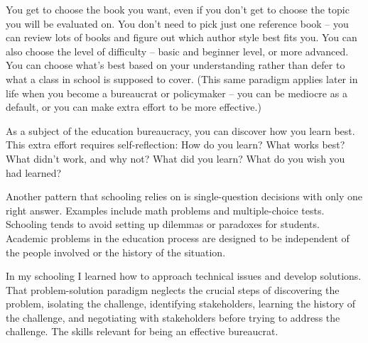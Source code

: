You get to choose the book you want, even if you don't get to choose the topic you will be evaluated on. You don't  need to pick just one reference book -- you can review lots of books and figure out which author style best fits you. You can also choose the level of difficulty -- basic and beginner level, or more advanced. You can choose what's best based on your understanding rather than defer to what a class in school is supposed to cover. (This same paradigm applies later in life when you become a bureaucrat or policymaker -- you can be mediocre as a default, or you can make extra effort to be more effective.)

As a subject of the education bureaucracy, you can discover how you learn best. This extra effort requires self-reflection: How do you learn? What works best? What didn't work, and why not? What did you learn? What do you wish you had learned?

Another pattern that schooling relies on is single-question decisions with only one right answer. Examples include math problems and multiple-choice tests. Schooling tends to avoid setting up dilemmas or paradoxes for students. Academic problems in the education process are designed to be independent of the people involved or the history of the situation. 









In my schooling I learned how to approach technical issues and develop solutions. That problem-solution paradigm neglects the crucial steps of discovering the problem, isolating the challenge, identifying stakeholders, learning the history of the challenge, and negotiating with stakeholders before trying to address the challenge.  The skills relevant for being an effective bureaucrat. 

